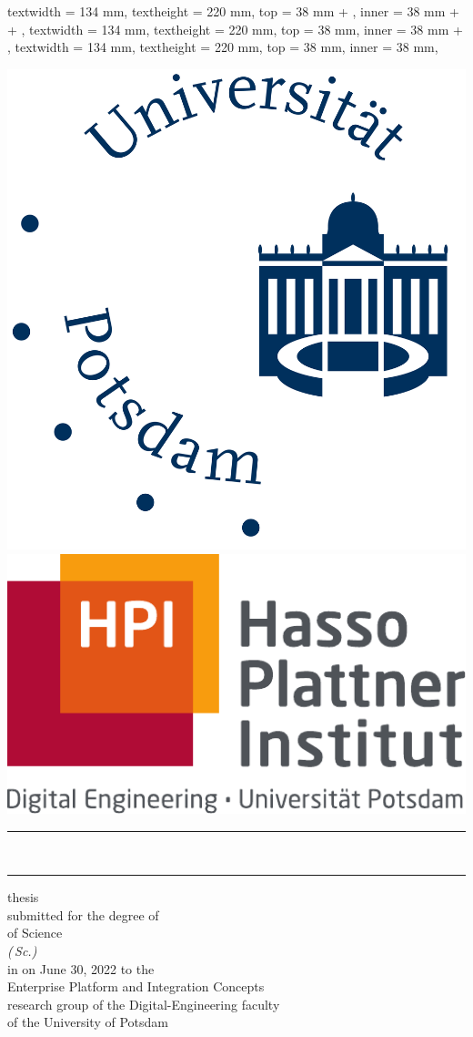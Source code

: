 
\ifprintVersion
	\ifprofessionalPrint
		\newgeometry
		{
			textwidth = 134 mm,
			textheight = 220 mm,
			top = 38 mm + \extraborderlength,
			inner = 38 mm + \mybindingcorrection + \extraborderlength,
		}
	\else
		\newgeometry
		{
			textwidth = 134 mm,
			textheight = 220 mm,
			top = 38 mm,
			inner = 38 mm + \mybindingcorrection,
		}
	\fi
\else
	\newgeometry
	{
		textwidth = 134 mm,
		textheight = 220 mm,
		top = 38 mm,
		inner = 38 mm,
	}
\fi

\begin{titlepage}
	\sffamily
	\begin{center}
		\includegraphics[height = 3.2 cm]{core/title_page/logo_UP.pdf} \hfill \includegraphics[height = 3 cm]{core/title_page/logo_HPI.pdf}\\
		\vfil
		{\LARGE
			\rule[1 ex]{\textwidth}{1.5 pt}
			\onehalfspacing\printTitleBold\\[1 ex]
			\rule[-1 ex]{\textwidth}{1 pt}
		}
		\vfil
		{\Large\textbf{\printAuthor}}
		\vfil
		{\large \colloquialDegreeName{} thesis\\[0.25 ex]
			submitted for the degree of}\\[0.25 ex]
		\bigskip
		{\Large \colloquialDegreeName{} of Science}\\[0.5 ex]
		{\large\emph{(\degreeAbbreviation\,Sc.)}}\\
		\bigskip
		{\large in
			\printProgram}
		\vfil
		{\large on June 30, 2022 to the\\[0.25 ex]
			Enterprise Platform and Integration Concepts\\[0.25 ex]
			research group of the Digital-Engineering faculty\\[0.25 ex]
			of the University of Potsdam}
	\end{center}


\end{titlepage}
